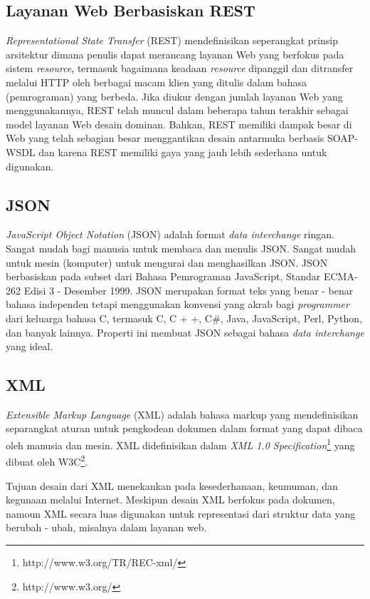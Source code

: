 \documentclass[a4paper, 12pt]{report}
\begin{document}
\subsection*{Layanan Web Berbasiskan REST}
\onehalfspacing \textit{Representational State Transfer} (REST) mendefinisikan seperangkat prinsip arsitektur dimana penulis dapat merancang layanan Web yang berfokus pada sistem \textit{resource}, termasuk bagaimana keadaan \textit{resource} dipanggil dan ditransfer melalui HTTP oleh berbagai macam klien yang ditulis dalam bahasa (pemrograman) yang berbeda. Jika diukur dengan jumlah layanan Web yang menggunakannya, REST telah muncul dalam beberapa tahun terakhir sebagai model layanan Web desain dominan. Bahkan, REST memiliki dampak besar di Web yang telah sebagian besar menggantikan desain antarmuka berbasis SOAP-WSDL dan karena REST memiliki gaya yang jauh lebih sederhana untuk digunakan\cite{ws-restful}.

\subsection*{JSON}
\onehalfspacing \textit{JavaScript Object Notation} (JSON) adalah format \textit{data interchange} ringan. Sangat mudah bagi manusia untuk membaca dan menulis JSON. Sangat mudah untuk mesin (komputer) untuk mengurai dan menghasilkan JSON. JSON berbasiskan pada subset dari Bahasa Pemrograman JavaScript, Standar ECMA-262 Edisi 3 - Desember 1999. JSON merupakan format teks yang benar - benar bahasa independen tetapi menggunakan konvensi yang akrab bagi \textit{programmer} dari keluarga bahasa C, termasuk C, C + +, C\#, Java, JavaScript, Perl, Python, dan banyak lainnya. Properti ini membuat JSON sebagai bahasa \textit{data interchange} yang ideal\cite{introducing-json}.

\subsection*{XML}
\onehalfspacing \textit{Extensible Markup Language} (XML) adalah bahasa markup yang mendefinisikan separangkat aturan untuk pengkodean dokumen dalam format yang dapat dibaca oleh manusia dan mesin. XML didefinisikan dalam \textit{XML 1.0 Specification}\footnote{http://www.w3.org/TR/REC-xml/} yang dibuat oleh W3C\footnote{http://www.w3.org/}\cite{xml-on-wikipedia}.

\onehalfspacing Tujuan desain dari XML menekankan pada kesederhanaan, keumuman, dan kegunaan melalui Internet. Meskipun desain XML berfokus pada dokumen, namoun XML secara luas digunakan untuk representasi dari struktur data yang berubah - ubah, misalnya dalam layanan web\cite{xml-on-wikipedia}.
\end{document}
